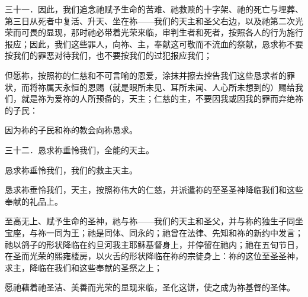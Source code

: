 \par

三十一．因此，我们追念祂赋予生命的苦难、祂救赎的十字架、祂的死亡与埋葬、第三日从死者中复活、升天、坐在祢——我们的天主和圣父右边，以及祂第二次光荣而可畏的显现，那时祂必带着光荣来临，审判生者和死者，按照各人的行为施行报应；因此，我们这些罪人，向祢、主，奉献这可敬而不流血的祭献，恳求祢不要按我们的罪恶对待我们，也不要按我们的过犯报应我们；\par

但愿祢，按照祢的仁慈和不可言喻的恩爱，涂抹并擦去控告我们这些恳求者的罪状，而将祢属天永恒的恩赐（就是眼所未见、耳所未闻、人心所未想到的）赐给我们，就是祢为爱祢的人所预备的，天主；仁慈的主，不要因我或因我的罪而弃绝祢的子民：\par

\par

因为祢的子民和祢的教会向祢恳求。\par

\par

\par

\par

三十二．恳求祢垂怜我们，全能的天主。\par

恳求祢垂怜我们，我们的救主天主。\par

恳求祢垂怜我们，天主，按照祢伟大的仁慈，并派遣祢的至圣圣神降临我们和这些奉献的礼品上。\par

\par

至高无上、赋予生命的圣神，祂与祢——我们的天主和圣父，并与祢的独生子同坐宝座，与祢一同为王；祂是同体、同永的；祂曾在法律、先知和祢的新约中发言；祂以鸽子的形状降临在约旦河我主耶稣基督身上，并停留在祂内；祂在五旬节日，在圣而光荣的熙雍楼房，以火舌的形状降临在祢的宗徒身上：祢的这位至圣圣神，求主，降临在我们和这些奉献的圣祭之上；\par

\par

愿祂藉着祂圣洁、美善而光荣的显现来临，圣化这饼，使之成为祢基督的圣体。\par

